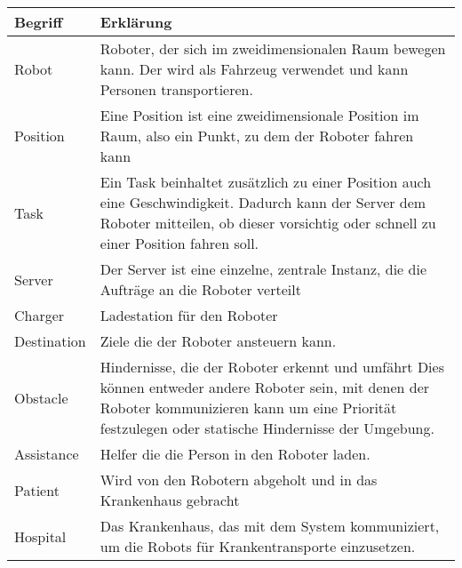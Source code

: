 	\begin{tabularx}{\textwidth}{|l|X|}
		\hline
		\textbf{Begriff} & \textbf{Erklärung}\\ \hline
		Robot & Roboter, der sich im zweidimensionalen Raum bewegen kann. Der wird
		als Fahrzeug verwendet und kann Personen transportieren.\\ \hline
		Position & Eine Position ist eine zweidimensionale Position im Raum,
		also ein Punkt, zu dem der Roboter fahren kann\\ \hline
		Task & Ein Task beinhaltet zusätzlich zu einer Position auch eine
		Geschwindigkeit. Dadurch kann der Server dem Roboter mitteilen, ob
		dieser vorsichtig oder schnell zu einer Position fahren
		soll.\\ \hline
		Server & Der Server ist eine einzelne, zentrale Instanz, die die Aufträge
		an die Roboter verteilt\\ \hline
		Charger & Ladestation für den Roboter\\ \hline
		Destination & Ziele die der Roboter ansteuern kann.\\ \hline
		Obstacle & Hindernisse, die der Roboter erkennt und umfährt Dies können
		entweder andere Roboter sein, mit denen der Roboter kommunizieren kann
		um eine Priorität festzulegen oder statische Hindernisse der
		Umgebung.\\ \hline
		Assistance & Helfer die die Person in den Roboter laden.\\ \hline
		Patient & Wird von den Robotern abgeholt und in das Krankenhaus gebracht\\ \hline
		Hospital & Das Krankenhaus, das mit dem System kommuniziert, um die Robots für Krankentransporte einzusetzen. \\ \hline
	\end{tabularx}
